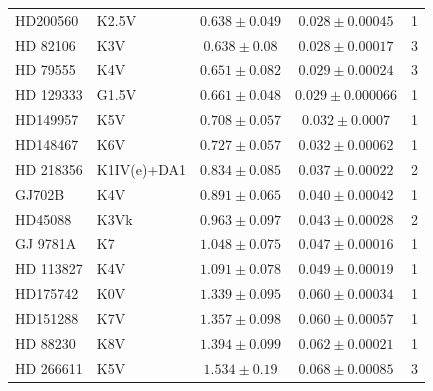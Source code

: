 \begin{subappendices}
\begin{table}[H]
\begin{center}
\begin{tabular}{l l c c c}
HD200560 & K2.5V & $0.638 \pm 0.049$ & $0.028 \pm 0.00045$ & 1 \\
HD  82106 & K3V & $0.638 \pm 0.08$ & $0.028 \pm 0.00017$ & 3 \\
HD 79555 & K4V & $0.651 \pm 0.082$ & $0.029 \pm 0.00024$ & 3 \\
HD 129333 & G1.5V & $0.661 \pm 0.048$ & $0.029 \pm 0.000066$ & 1 \\
HD149957 & K5V & $0.708 \pm 0.057$ & $0.032 \pm 0.0007$ & 1 \\
HD148467 & K6V & $0.727 \pm 0.057$ & $0.032 \pm 0.00062$ & 1 \\
HD 218356 & K1IV(e)+DA1 & $0.834 \pm 0.085$ & $0.037 \pm 0.00022$ & 2 \\
GJ702B & K4V & $0.891 \pm 0.065$ & $0.040 \pm 0.00042$ & 1 \\
HD45088 & K3Vk & $0.963 \pm 0.097$ & $0.043 \pm 0.00028$ & 2 \\
GJ 9781A & K7 & $1.048 \pm 0.075$ & $0.047 \pm 0.00016$ & 1 \\
HD 113827 & K4V & $1.091 \pm 0.078$ & $0.049 \pm 0.00019$ & 1 \\
HD175742 & K0V & $1.339 \pm 0.095$ & $0.060 \pm 0.00034$ & 1 \\
HD151288 & K7V & $1.357 \pm 0.098$ & $0.060 \pm 0.00057$ & 1 \\
HD 88230 & K8V & $1.394 \pm 0.099$ & $0.062 \pm 0.00021$ & 1 \\
HD 266611 & K5V & $1.534 \pm 0.19$ & $0.068 \pm 0.00085$ & 3 \\
\end{tabular}
\end{center}
\end{table}


\end{subappendices}
